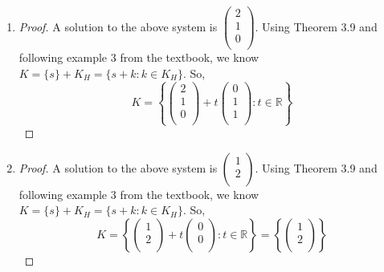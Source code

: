 \documentclass[11pt]{scrartcl}
\begin{document}
\begin{enumerate}[label=\alph*.]
{\begin{proof}
\[				t\begin{pmatrix}
					1\\
					2\\
					3\\
				\end{pmatrix}: t \in \mathbb{R}
			\right\}
			\]
		\end{proof}
	}
	\item{
		\begin{proof}
			A solution to the above system is  
			$
			\begin{pmatrix}
				2\\
				1\\
				0\\
			\end{pmatrix}
			$.	
			Using Theorem 3.9 and following example 3 from the textbook, we know $K = \{s\} + K_H = \{s + k : k \in K_H \}$.
			So, 
			\[
			K=
			\left\{
				\begin{pmatrix}
					2\\
					1\\
					0\\
				\end{pmatrix} +
				t\begin{pmatrix}
					0\\
					1\\
					1\\
				\end{pmatrix}: t \in \mathbb{R}
			\right\}
			\]
		\end{proof}
	}
	\item{
		\begin{proof}
			A solution to the above system is  
			$
			\begin{pmatrix}
				1\\
				2\\
			\end{pmatrix}
			$.	
			Using Theorem 3.9 and following example 3 from the textbook, we know $K = \{s\} + K_H = \{s + k : k \in K_H \}$.
			So, 
			\[
			K=
			\left\{
				\begin{pmatrix}
					1\\
					2\\
				\end{pmatrix} +
				t\begin{pmatrix}
					0\\
					0\\
				\end{pmatrix}: t \in \mathbb{R}
			\right\} = 
			\left\{
				\begin{pmatrix}
					1\\
					2\\
				\end{pmatrix} 
			\right\}
			\]
		\end{proof}	
	}

\end{enumerate}
\end{document}
